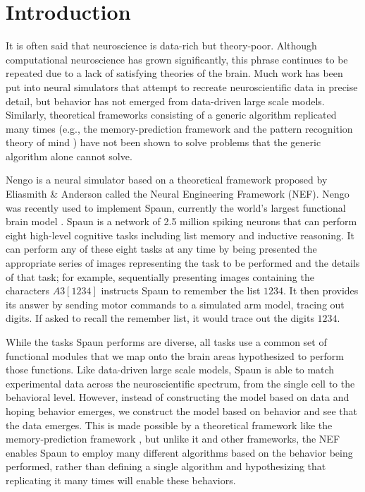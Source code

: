\documentclass{frontiersSCNS}
\begin{document}
\section{Introduction}

It is often said that neuroscience
is data-rich but theory-poor.
Although computational neuroscience
has grown significantly,
this phrase continues to be repeated
due to a lack of satisfying
theories of the brain.
Much work has been put into neural simulators
that attempt to recreate neuroscientific
data in precise detail,
but behavior has not emerged
from data-driven large scale models.
Similarly, theoretical frameworks
consisting of a generic algorithm
replicated many times
(e.g., the memory-prediction framework \cite{TODO}
and the pattern recognition theory of mind \cite{TODO})
have not been shown to solve problems
that the generic algorithm alone cannot solve.

Nengo is a neural simulator
based on a theoretical framework proposed
by Eliasmith \& Anderson \citeyearpar{TODO}
called the Neural Engineering Framework
(NEF).
Nengo was recently used to implement Spaun,
currently the world's largest functional brain model
\cite{TODO}.
Spaun is a network of 2.5 million spiking neurons
that can perform eight high-level cognitive tasks
including list memory and inductive reasoning.
It can perform any of these eight tasks
at any time by being presented
the appropriate series of images
representing the task to be performed
and the details of that task;
for example, sequentially presenting images
containing the characters $A3[1234]$ instructs Spaun
to remember the list $1234$.
It then provides its answer by
sending motor commands to a simulated arm model,
tracing out digits.
If asked to recall the remember list,
it would trace out the digits $1234$.

While the tasks Spaun performs are diverse,
all tasks use a common set of
functional modules that we map
onto the brain areas hypothesized
to perform those functions.
Like data-driven large scale models,
Spaun is able to match experimental data
across the neuroscientific spectrum,
from the single cell to the behavioral level.
However, instead of constructing the model
based on data and hoping behavior emerges,
we construct the model
based on behavior
and see that the data emerges.
This is made possible by a theoretical framework
like the memory-prediction framework \cite{TODO},
but unlike it and other frameworks,
the NEF enables Spaun to employ
many different algorithms
based on the behavior being performed,
rather than defining a single algorithm
and hypothesizing that replicating it
many times will enable these behaviors.
\end{document}
